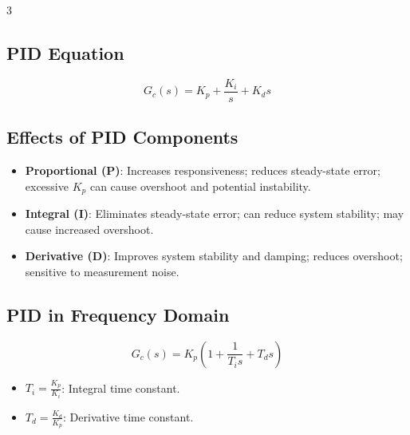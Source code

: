 \documentclass[letterpaper,10pt]{article}
\begin{document}
\begin{multicols}{3}
\subsection*{PID Equation}
\[
G_c(s) = K_p + \frac{K_i}{s} + K_d s
\]
\subsection*{Effects of PID Components}
\begin{itemize}[leftmargin=*]
    \item \textbf{Proportional (P)}: Increases responsiveness; reduces steady-state error; excessive \( K_p \) can cause overshoot and potential instability.
    
    \item \textbf{Integral (I)}: Eliminates steady-state error; can reduce system stability; may cause increased overshoot.
    
    \item \textbf{Derivative (D)}: Improves system stability and damping; reduces overshoot; sensitive to measurement noise.
\end{itemize}

\subsection*{PID in Frequency Domain}
\[
G_c(s) = K_p \left(1 + \frac{1}{T_i s} + T_d s \right)
\]
\begin{itemize}[leftmargin=*]
    \item \( T_i = \frac{K_p}{K_i} \): Integral time constant.
    \item \( T_d = \frac{K_d}{K_p} \): Derivative time constant.
\end{itemize}

\section*{}

\end{multicols}
\end{document}
